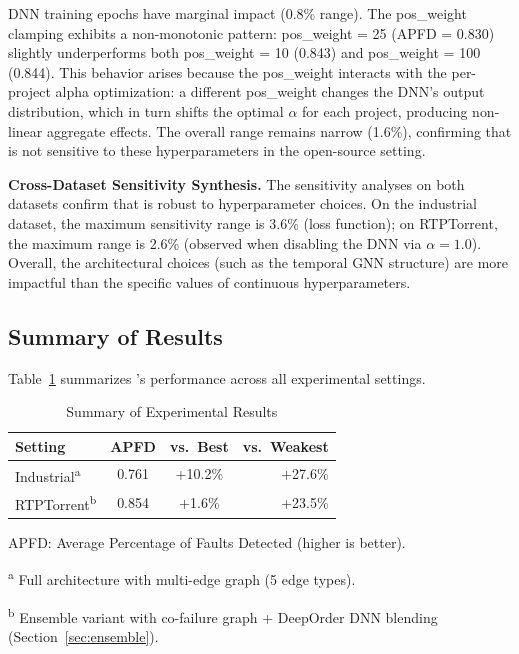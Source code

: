 DNN training epochs have marginal impact (0.8\% range). The pos\_weight
clamping exhibits a non-monotonic pattern: pos\_weight = 25 (APFD = 0.830)
slightly underperforms both pos\_weight = 10 (0.843) and pos\_weight = 100
(0.844). This behavior arises because the pos\_weight interacts with the
per-project alpha optimization: a different pos\_weight changes the DNN's
output distribution, which in turn shifts the optimal $\alpha$ for each
project, producing non-linear aggregate effects. The overall range remains
narrow (1.6\%), confirming that \filopriori{} is not sensitive to these
hyperparameters in the open-source setting.

\textbf{Cross-Dataset Sensitivity Synthesis.}
The sensitivity analyses on both datasets confirm that \filopriori{} is robust
to hyperparameter choices. On the industrial dataset, the maximum sensitivity
range is 3.6\% (loss function); on RTPTorrent, the maximum range is 2.6\%
(observed when disabling the DNN via $\alpha = 1.0$). Overall, the
architectural choices (such as the temporal GNN structure) are more impactful
than the specific values of continuous hyperparameters.


\subsection{Summary of Results}
\label{sec:results_summary}

Table~\ref{tab:results_summary} summarizes \filopriori{}'s performance across
all experimental settings.

\begin{table}[!t]
\centering
\caption{Summary of Experimental Results}
\label{tab:results_summary}
\scriptsize
\begin{tabular}{lccr}
\toprule
\textbf{Setting} & \textbf{APFD} & \textbf{vs.\ Best} & \textbf{vs.\ Weakest} \\
\midrule
Industrial\textsuperscript{a} & 0.761 & +10.2\% & +27.6\% \\
RTPTorrent\textsuperscript{b} & 0.854 & +1.6\% & +23.5\% \\
\bottomrule
\end{tabular}
\begin{tablenotes}
\small
\item APFD: Average Percentage of Faults Detected (higher is better).
\item \textsuperscript{a} Full architecture with multi-edge graph (5 edge types).
\item \textsuperscript{b} Ensemble variant with co-failure graph + DeepOrder DNN blending (Section~\ref{sec:ensemble}).
\end{tablenotes}
\end{table}

